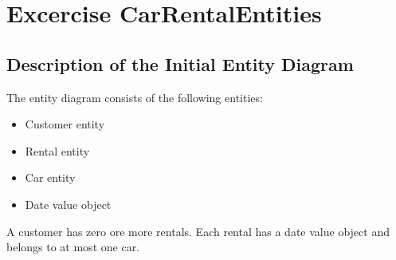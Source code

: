 \label{cha:design_of_data_and_functionality}

\section{Excercise CarRentalEntities}

\subsection*{Description of the Initial Entity Diagram}
The entity diagram consists of the following entities:
\begin{itemize}
    \item Customer entity
    \item Rental entity
    \item Car entity
    \item Date value object
\end{itemize}
A customer has zero ore more rentals.
Each rental has a date value object and belongs to at most one car.

